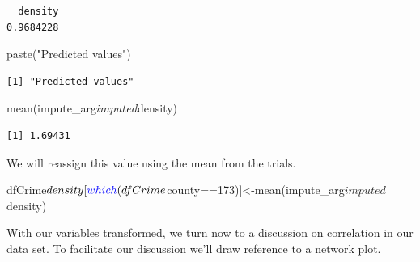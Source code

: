 \documentclass[]{article}
\newenvironment{Shaded}{}{}
\newcommand{\DecValTok}[1]{#1}
\newcommand{\KeywordTok}[1]{\textcolor[rgb]{0.00,0.00,1.00}{#1}}
\newcommand{\NormalTok}[1]{#1}
\newcommand{\OperatorTok}[1]{#1}
\newcommand{\StringTok}[1]{\textcolor[rgb]{0.00,0.50,0.50}{#1}}
\begin{document}
\begin{verbatim}
  density 
0.9684228 
\end{verbatim}

\begin{Shaded}
\begin{Highlighting}[]
\KeywordTok{paste}\NormalTok{(}\StringTok{"Predicted values"}\NormalTok{)}
\end{Highlighting}
\end{Shaded}

\begin{verbatim}
[1] "Predicted values"
\end{verbatim}

\begin{Shaded}
\begin{Highlighting}[]
\KeywordTok{mean}\NormalTok{(impute_arg}\OperatorTok{$}\NormalTok{imputed}\OperatorTok{$}\NormalTok{density)}
\end{Highlighting}
\end{Shaded}

\begin{verbatim}
[1] 1.69431
\end{verbatim}

We will reassign this value using the mean from the trials.

\begin{Shaded}
\begin{Highlighting}[]
\NormalTok{dfCrime}\OperatorTok{$}\NormalTok{density[}\KeywordTok{which}\NormalTok{(dfCrime}\OperatorTok{$}\NormalTok{county}\OperatorTok{==}\DecValTok{173}\NormalTok{)]<-}\KeywordTok{mean}\NormalTok{(impute_arg}\OperatorTok{$}\NormalTok{imputed}\OperatorTok{$}\NormalTok{density)}
\end{Highlighting}
\end{Shaded}

With our variables transformed, we turn now to a discussion on
correlation in our data set. To facilitate our discussion we'll draw
reference to a network plot.
\end{document}
